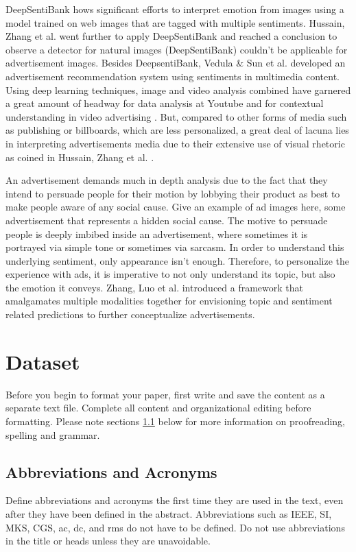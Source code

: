 \documentclass[conference]{IEEEtran}
\begin{document}
DeepSentiBank \cite{b10} hows significant efforts to interpret emotion from images using a model trained on web images that are tagged with multiple sentiments. Hussain, Zhang et al.
\cite{b11} went further to apply DeepSentiBank and reached a conclusion to observe a detector for natural images (DeepSentiBank) couldn’t be applicable for advertisement images. Besides DeepsentiBank, Vedula \& Sun et al. \cite{b12} developed an advertisement recommendation system using sentiments in multimedia content. Using deep learning techniques, image and video analysis combined have garnered a great amount of headway for data analysis at Youtube and for contextual understanding in video advertising \cite{b13}.
But, compared to other forms of media such as publishing or billboards, which are less personalized, a great deal of lacuna lies in interpreting advertisements media due to their extensive use of visual rhetoric as coined in Hussain, Zhang et al. \cite{b11}. 

An advertisement demands much in depth analysis due to the fact that they intend to persuade people for their motion by lobbying their product as best to make people aware of any social cause. Give an example of ad images here, some advertisement that represents a hidden social cause. The motive to persuade people is deeply imbibed inside an advertisement, where sometimes it is portrayed via simple tone or sometimes via sarcasm. In order to understand this underlying sentiment, only appearance isn’t enough. Therefore, to personalize the experience with ads, it is imperative to  not only understand its topic, but also the emotion it conveys. Zhang, Luo et al. \cite{b14} introduced a framework that amalgamates multiple modalities together for envisioning topic and sentiment related predictions to further conceptualize advertisements.

\section{Dataset}
Before you begin to format your paper, first write and save the content as a 
separate text file. Complete all content and organizational editing before 
formatting. Please note sections \ref{AA} below for more information on 
proofreading, spelling and grammar.

\subsection{Abbreviations and Acronyms}\label{AA}
Define abbreviations and acronyms the first time they are used in the text, 
even after they have been defined in the abstract. Abbreviations such as 
IEEE, SI, MKS, CGS, ac, dc, and rms do not have to be defined. Do not use 
abbreviations in the title or heads unless they are unavoidable.
\end{document}
